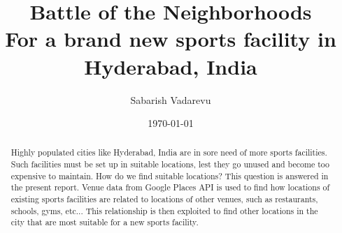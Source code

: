 \documentclass[11pt]{report}            %
\title{\bf Battle of the Neighborhoods\\
For a brand new sports facility in Hyderabad, India}  %
\author{Sabarish Vadarevu}              %
\date{\today}                           %
\begin{document}
\maketitle                              %
\setcounter{page}{2}                    %
\tableofcontents                        %






\begin{abstract}
Highly populated cities like Hyderabad, India are in sore need of more sports facilities. Such facilities must be set up in suitable locations, lest they go unused and become too expensive to maintain. How do we find suitable locations? This question is answered in the present report. Venue data from Google Places API is used to find how locations of existing sports facilities are related to locations of other venues, such as restaurants, schools, gyms, etc... This relationship is then exploited to find other locations in the city that are most suitable for a new sports facility. 
\end{abstract}










%
%
%

\begin{appendices}

\end{appendices}
\end{document}
